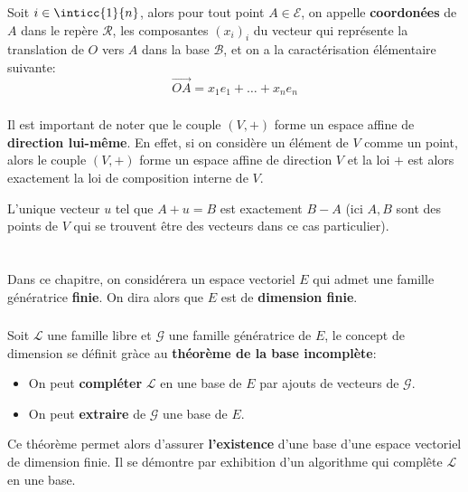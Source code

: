 Soit \(i\in\inticc{1}{n}\), alors pour tout point \(A \in \mathscr{E}\), on appelle \textbf{coordonées} de \(A\) dans le repère \(\mathscr{R}\), les composantes \((x_i)_i\) du vecteur qui représente la translation de \(O\) vers \(A\) dans la base \(\mathscr{B}\), et on a la caractérisation élémentaire suivante:
\[
   \overrightarrow{OA} = x_1e_1 + \ldots + x_ne_n 
\]
\subsection*{}
Il est important de noter que le couple \((V, +)\) forme un espace affine de \textbf{direction lui-même}. En effet, si on considère un élément de \(V\) comme un point, alors le couple  \((V, +)\) forme un espace affine de direction \(V\) et la loi \(+\) est alors exactement la loi de composition interne de \(V\).\<

L'unique vecteur \(u\) tel que \(A + u = B\) est exactement \(B - A\) (ici \(A, B\) sont des points de \(V\) qui se trouvent être des vecteurs dans ce cas particulier).

\chapter*{} %

Dans ce chapitre, on considérera un espace vectoriel \(E\) qui admet une famille génératrice \textbf{finie}. On dira alors que \(E\) est de \textbf{dimension finie}.

\subsection*{}

Soit \(\mathcal{L}\) une famille libre et \(\mathcal{G}\) une famille génératrice de \(E\), le concept de dimension se définit gràce au \textbf{théorème de la base incomplète}:
\begin{itemize}
   \item On peut \textbf{compléter} \(\mathcal{L}\) en une base de \(E\) par ajouts de vecteurs de \(\mathcal{G}\).
   \item On peut \textbf{extraire} de \(\mathcal{G}\) une base de \(E\).
\end{itemize}
Ce théorème permet alors d'assurer \textbf{l'existence} d'une base d'une espace vectoriel de dimension finie. Il se démontre par exhibition d'un algorithme qui complête \( \mathcal{L} \) en une base.
